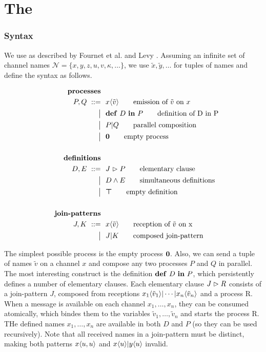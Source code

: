\section{The \JoinCalc}

\subsubsection{Syntax}

We use \joincalc as described by Fournet et al.
\cite{fournet_calculus_1996} and Levy \cite{levy_results_1997}.
Assuming an infinite set of channel names
$ \mathcal{N} = \{ x, y, z, u, v, \kappa, \ldots \} $,
we use
$ \tilde{x}, \tilde{y}, \ldots $
for tuples of names
and define the syntax as follows.

\begin{align}
  \tag*{\textbf{processes}}
  \\
  P, Q
  \grmr \jsnd{x}{\tilde{v}}   \tag*{emission of $\tilde{v}$ on $x$}
  \altn \nonumber \jdef{D}{P} \tag*{definition of D in P}
  \altn P \jpar Q             \tag*{parallel composition}
  \altn \jnullproc            \tag*{empty process}
  \\ \nonumber
  \\
  \tag*{\textbf{definitions}}
  \\
  D, E
  \grmr \jrct{J}{P} \tag*{elementary clause}
  \altn D \jcon E   \tag*{simultaneous definitions}
  \altn \jnulldef   \tag*{empty definition}
  \\ \nonumber
  \\
  \tag*{\textbf{join-patterns}}
  \\
  J, K
  \grmr \jrcv{x}{\tilde{v}} \tag*{reception of $\tilde{v}$ on x}
  \altn J \jpat K           \tag*{composed join-pattern}
\end{align}

The simplest possible process is the empty process $\textbf{\textup{0}}$.
Also, we can send a tuple of names $\tilde{v}$ on a channel $x$
and compose any two processes $P$ and $Q$ in parallel.
The most interesting construct is the definition $\textbf{\textup{def}} \ D \ \textbf{\textup{in}} \ P$,
which persistently defines a number of elementary clauses.
Each elementary clause $J \vartriangleright R$ consists of
a join-pattern $J$,
composed from receptions
$x_1\langle\tilde{v}_1\rangle | \cdots | x_n\langle\tilde{v}_n\rangle$
and a process R.
When a message is available on each channel $x_1, \ldots, x_n$,
they can be consumed atomically,
which bindes them to the variables $\tilde{v}_1, \ldots, \tilde{v}_n$
and starts the process R.
THe defined names $x_1, \ldots, x_n$ are available in both $D$ and $P$
(so they can be used recursively).
Note that all received names in a join-pattern must be distinct,
making both patterns
$ x\langle u,u\rangle $ and
$ x\langle u\rangle | y\langle u\rangle $
invalid.

